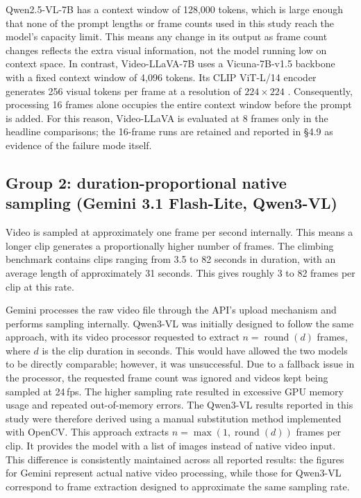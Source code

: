 \documentclass[logo,msc]{infthesis}
\begin{document}
Qwen2.5-VL-7B has a context window of 128{,}000 tokens, which is large
enough that none of the prompt lengths or frame counts used in this study
reach the model's capacity limit. This means any change in its output as
frame count changes reflects the extra visual information, not the model
running low on context space. In contrast, Video-LLaVA-7B uses a
Vicuna-7B-v1.5 backbone with a fixed context window of 4{,}096 tokens. Its
CLIP ViT-L/14 encoder generates 256 visual tokens per frame at a resolution
of $224\times224$ \citep{radford2021}. Consequently, processing 16 frames
alone occupies the entire context window before the prompt is added. For
this reason, Video-LLaVA is evaluated at 8 frames only in the headline
comparisons; the 16-frame runs are retained and reported in §4.9 as
evidence of the failure mode itself.

\subsection*{Group 2: duration-proportional native sampling
(Gemini 3.1 Flash-Lite, Qwen3-VL)}

Video is sampled at approximately one frame per second internally. This
means a longer clip generates a proportionally higher number of frames. The
climbing benchmark contains clips ranging from 3.5 to 82 seconds in
duration, with an average length of approximately 31 seconds. This gives
roughly 3 to 82 frames per clip at this rate.

Gemini processes the raw video file through the API's upload mechanism and
performs sampling internally. Qwen3-VL was initially designed to follow the
same approach, with its video processor requested to extract
$n = \operatorname{round}(d)$ frames, where $d$ is the clip duration in
seconds. This would have allowed the two models to be directly comparable;
however, it was unsuccessful. Due to a fallback issue in the processor, the
requested frame count was ignored and videos kept being sampled at 24\,fps.
The higher sampling rate resulted in excessive GPU memory usage and
repeated out-of-memory errors. The Qwen3-VL results reported in this study
were therefore derived using a manual substitution method implemented with
OpenCV. This approach extracts
$n = \max(1, \operatorname{round}(d))$ frames per clip. It provides the model with a list of images instead of native video
input. This difference is consistently maintained across all reported
results: the figures for Gemini represent actual native video processing,
while those for Qwen3-VL correspond to frame extraction designed to
approximate the same sampling rate.
\end{document}
